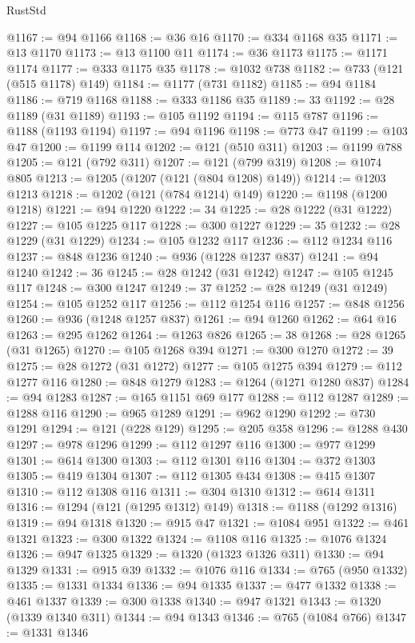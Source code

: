 \begin{lexlean}{RustStd}
\begin{coremodule}
{\begin{coremodule}
{{{{{{{{{{{{{{{{{{{{{{{{{{{{{{{{{{{{{{{{{{{{@1167 := @94 @1166
@1168 := @36 @16
@1170 := @334 @1168 @35
@1171 := @13 @1170
@1173 := @13 @1100 @11
@1174 := @36 @1173
@1175 := @1171 @1174
@1177 := @333 @1175 @35
@1178 := @1032 @738
@1182 := @733 (@121 (@515 @1178) @149)
@1184 := @1177 (@731 @1182)
@1185 := @94 @1184
@1186 := @719 @1168
@1188 := @333 @1186 @35
@1189 := 33
@1192 := @28 @1189 (@31 @1189)
@1193 := @105 @1192
@1194 := @115 @787
@1196 := @1188 (@1193 @1194)
@1197 := @94 @1196
@1198 := @773 @47
@1199 := @103 @47
@1200 := @1199 @114
@1202 := @121 (@510 @311)
@1203 := @1199 @788
@1205 := @121 (@792 @311)
@1207 := @121 (@799 @319)
@1208 := @1074 @805
@1213 := @1205 (@1207 (@121 (@804 @1208) @149))
@1214 := @1203 @1213
@1218 := @1202 (@121 (@784 @1214) @149)
@1220 := @1198 (@1200 @1218)
@1221 := @94 @1220
@1222 := 34
@1225 := @28 @1222 (@31 @1222)
@1227 := @105 @1225 @117
@1228 := @300 @1227
@1229 := 35
@1232 := @28 @1229 (@31 @1229)
@1234 := @105 @1232 @117
@1236 := @112 @1234 @116
@1237 := @848 @1236
@1240 := @936 (@1228 @1237 @837)
@1241 := @94 @1240
@1242 := 36
@1245 := @28 @1242 (@31 @1242)
@1247 := @105 @1245 @117
@1248 := @300 @1247
@1249 := 37
@1252 := @28 @1249 (@31 @1249)
@1254 := @105 @1252 @117
@1256 := @112 @1254 @116
@1257 := @848 @1256
@1260 := @936 (@1248 @1257 @837)
@1261 := @94 @1260
@1262 := @64 @16
@1263 := @295 @1262
@1264 := @1263 @826
@1265 := 38
@1268 := @28 @1265 (@31 @1265)
@1270 := @105 @1268 @394
@1271 := @300 @1270
@1272 := 39
@1275 := @28 @1272 (@31 @1272)
@1277 := @105 @1275 @394
@1279 := @112 @1277 @116
@1280 := @848 @1279
@1283 := @1264 (@1271 @1280 @837)
@1284 := @94 @1283
@1287 := @165 @1151 @69 @177
@1288 := @112 @1287
@1289 := @1288 @116
@1290 := @965 @1289
@1291 := @962 @1290
@1292 := @730 @1291
@1294 := @121 (@228 @129)
@1295 := @205 @358
@1296 := @1288 @430
@1297 := @978 @1296
@1299 := @112 @1297 @116
@1300 := @977 @1299
@1301 := @614 @1300
@1303 := @112 @1301 @116
@1304 := @372 @1303
@1305 := @419 @1304
@1307 := @112 @1305 @434
@1308 := @415 @1307
@1310 := @112 @1308 @116
@1311 := @304 @1310
@1312 := @614 @1311
@1316 := @1294 (@121 (@1295 @1312) @149)
@1318 := @1188 (@1292 @1316)
@1319 := @94 @1318
@1320 := @915 @47
@1321 := @1084 @951
@1322 := @461 @1321
@1323 := @300 @1322
@1324 := @1108 @116
@1325 := @1076 @1324
@1326 := @947 @1325
@1329 := @1320 (@1323 @1326 @311)
@1330 := @94 @1329
@1331 := @915 @39
@1332 := @1076 @116
@1334 := @765 (@950 @1332)
@1335 := @1331 @1334
@1336 := @94 @1335
@1337 := @477 @1332
@1338 := @461 @1337
@1339 := @300 @1338
@1340 := @947 @1321
@1343 := @1320 (@1339 @1340 @311)
@1344 := @94 @1343
@1346 := @765 (@1084 @766)
@1347 := @1331 @1346
}}}}}}}}}}}}}}}}}}}}}}}}}}}}}}}}}}}}}}}}}}}}
\end{coremodule}}
\end{coremodule}
\end{lexlean}
